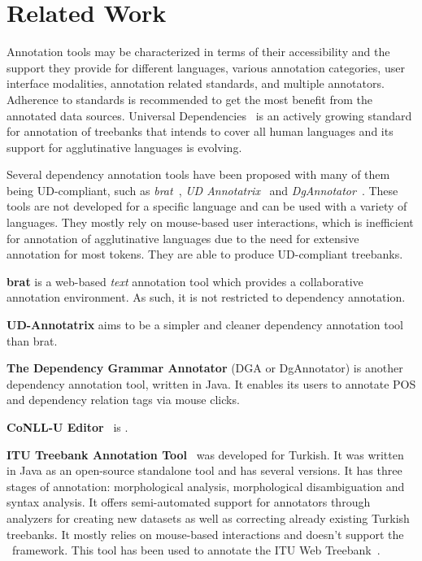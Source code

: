 \section{Related Work}
\label{sec:related}

Annotation tools may be characterized in terms of their accessibility and the support they provide for different languages, various annotation categories, user interface modalities, annotation related standards, and multiple annotators.
Adherence to standards is recommended to get the most benefit from the annotated data sources.
Universal Dependencies~\cite{UD} is an actively growing standard for annotation of treebanks that intends to cover all human languages and its support for agglutinative languages is evolving.

Several dependency annotation tools have been proposed with many of them being UD-compliant, such as \textit{brat}~\cite{brat}, \textit{UD Annotatrix}~\cite{ud-annotatrix} and \textit{DgAnnotator}~\cite{dgannotator}.
These tools are not developed for a specific language and can be used with a variety of languages.
They mostly rely on mouse-based user interactions, which is inefficient for annotation of agglutinative languages due to the need for extensive annotation for most tokens.
They are able to produce UD-compliant treebanks.

\textbf{brat} is a web-based \textit{text} annotation tool which provides a collaborative annotation environment. As such, it is not restricted to dependency annotation.

\textbf{UD-Annotatrix} aims to be a simpler and cleaner dependency annotation tool than brat.

\textbf{The Dependency Grammar Annotator} (DGA or DgAnnotator) is another dependency annotation tool, written in Java. It enables its users to annotate POS and dependency relation tags via mouse clicks.

\textbf{CoNLL-U Editor}~\cite{conll-u_editor} is .

\textbf{ITU Treebank Annotation Tool}~\cite{itu-annotation-tool} was developed for Turkish.
It was written in Java as an open-source standalone tool and has several versions.
It has three stages of annotation: morphological analysis, morphological disambiguation and syntax analysis.
It offers semi-automated support for annotators through analyzers for creating new datasets as well as correcting already existing Turkish treebanks.
It mostly relies on mouse-based interactions and doesn't support the \ud\ framework.
This tool has been used to annotate the ITU Web Treebank~\cite{itu-web-tb}.

